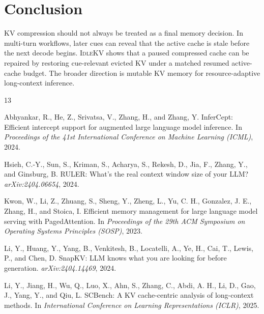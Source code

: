 \documentclass{article}
\newcommand{\idlekv}{\textsc{IdleKV}}
\begin{document}
\section{Conclusion}
\label{sec:conclusion}

KV compression should not always be treated as a final memory decision.
In multi-turn workflows, later cues can reveal that the active cache is
stale before the next decode begins.
\idlekv{} shows that a paused compressed cache can be repaired by
restoring cue-relevant evicted KV under a matched resumed active-cache
budget.
The broader direction is mutable KV memory for resource-adaptive
long-context inference.

\begin{thebibliography}{13}

Abhyankar, R., He, Z., Srivatsa, V., Zhang, H., and Zhang, Y.
\newblock InferCept: Efficient intercept support for augmented large
  language model inference.
\newblock In \emph{Proceedings of the 41st International Conference on
  Machine Learning (ICML)}, 2024.

Hsieh, C.-Y., Sun, S., Kriman, S., Acharya, S., Rekesh, D., Jia, F.,
  Zhang, Y., and Ginsburg, B.
\newblock RULER: What's the real context window size of your LLM?
\newblock \emph{arXiv:2404.06654}, 2024.

Kwon, W., Li, Z., Zhuang, S., Sheng, Y., Zheng, L., Yu, C. H.,
  Gonzalez, J. E., Zhang, H., and Stoica, I.
\newblock Efficient memory management for large language model serving
  with PagedAttention.
\newblock In \emph{Proceedings of the 29th ACM Symposium on Operating
  Systems Principles (SOSP)}, 2023.

Li, Y., Huang, Y., Yang, B., Venkitesh, B., Locatelli, A., Ye, H.,
  Cai, T., Lewis, P., and Chen, D.
\newblock SnapKV: LLM knows what you are looking for before generation.
\newblock \emph{arXiv:2404.14469}, 2024.

Li, Y., Jiang, H., Wu, Q., Luo, X., Ahn, S., Zhang, C., Abdi, A. H.,
  Li, D., Gao, J., Yang, Y., and Qiu, L.
\newblock SCBench: A KV cache-centric analysis of long-context methods.
\newblock In \emph{International Conference on Learning Representations
  (ICLR)}, 2025.


\end{thebibliography}
\end{document}
